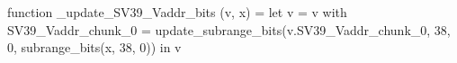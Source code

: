 function _update_SV39_Vaddr_bits (v, x) = let v = { v with SV39_Vaddr_chunk_0 = update_subrange_bits(v.SV39_Vaddr_chunk_0, 38, 0, subrange_bits(x, 38, 0)) } in
  v
